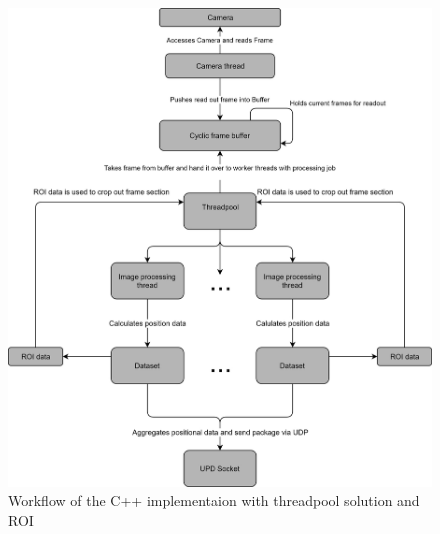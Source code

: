 \begin{figure}[H]
\includegraphics[scale=0.4]{images/pi_workflow_500.jpg}
\caption{Workflow of the C++ implementaion with threadpool solution and ROI}
\label{c++ workflow map} 
\end{figure}
